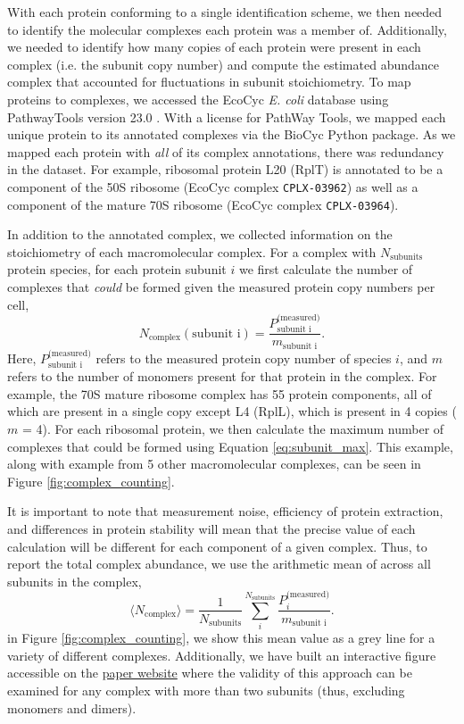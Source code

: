 With each protein conforming to a single identification
scheme, we then needed to identify the molecular complexes each protein was a
member of. Additionally, we needed to identify how many copies of each protein
were present in each complex (i.e. the subunit copy number) and compute the
estimated abundance complex that accounted for fluctuations in subunit
stoichiometry. To map proteins to complexes, we accessed the
EcoCyc \textit{E. coli} database \cite{keseler2017} using PathwayTools version
23.0 \cite{karp2019}. With a license for PathWay Tools, we
mapped each unique protein to its annotated complexes via the
BioCyc Python package. As we mapped each protein with \textit{all} of its
complex annotations, there was redundancy in the dataset. For example, ribosomal
protein L20 (RplT) is annotated to be a component of the 50S ribosome (EcoCyc
complex \texttt{CPLX-03962}) as well as a component of the mature 70S ribosome
(EcoCyc complex \texttt{CPLX-03964}).

In addition to the annotated complex, we collected information on the
stoichiometry of each macromolecular complex. For a complex with $N_\text{subunits}$ protein species,
for each protein subunit $i$ we first calculate the number of complexes that
\textit{could} be formed given the measured protein copy numbers per cell,
\begin{equation}
    N_\text{complex}(\text{subunit i}) = \frac{P_\text{subunit i}^\text{(measured)}}{m_\text{subunit i}}.
    \label{eq:subunit_max}
\end{equation}
Here, $P_\text{subunit i}^\text{(measured)}$ refers to the measured protein copy number of species $i$,
and $m$ refers to the number of monomers present for that protein in the complex. For example, the 70S mature ribosome complex has 55 protein components, all of
which are present in a single copy except L4 (RplL), which is present in 4
copies ($m$ = 4). For each ribosomal protein, we then calculate the  maximum number of
complexes that could be formed using Equation \ref{eq:subunit_max}. This example, along with
example from 5 other macromolecular complexes, can be seen in
Figure \ref{fig:complex_counting}.

It is important to note that measurement noise, efficiency of protein
extraction, and differences in protein stability will mean that the precise value of each
calculation will be different for each component of a given complex. Thus, to
report the total complex abundance, we use the arithmetic mean of
across all subunits in the complex,
\begin{equation}
   \langle N_\text{complex} \rangle = \frac{1}{N_\text{subunits}}\sum\limits_i^{N_\text{subunits}} \frac{P_{i}^\text{(measured)}}{m_\text{subunit i}}.
   \label{eq:complex_count}
\end{equation}
in Figure \ref{fig:complex_counting}, we show this mean value as a grey line for a variety
of different complexes. Additionally, we have built an interactive figure
accessible on the \href{https://www.rpgroup.caltech.edu/growth_limits}{paper
website} where the validity of this approach can be examined for any complex
with more than two subunits (thus, excluding monomers and dimers).

